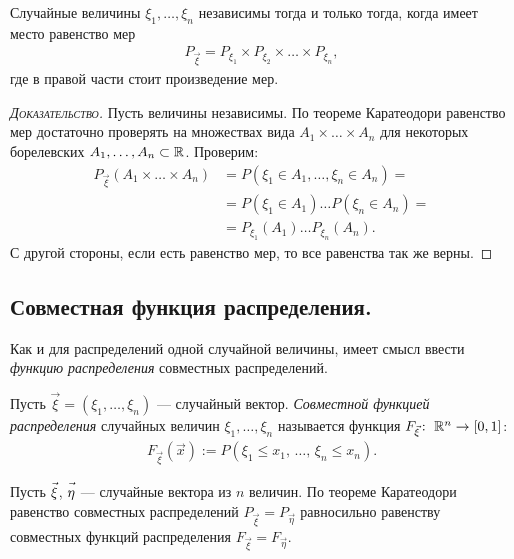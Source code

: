 \documentclass[../main.tex]{subfiles}
\begin{document}
\begin{thm}
 \label{theorem:random_variable_independence_through_distribution_measure_eq}
 Случайные величины $ \xi_1, \ldots, \xi_n $ независимы тогда и только тогда, когда имеет место равенство мер
 \begin{align}
  \label{equation:random_variable_independence_through_distribution_measure_eq}
  P_{\vec\xi} = P_{\xi_1} \times P_{\xi_2} \times \ldots \times P_{\xi_n},
 \end{align} где в правой части стоит произведение мер.
\end{thm}
\begin{proof}[\normalfont\textsc{Доказательство}]
 Пусть величины независимы. По теореме Каратеодори равенство мер достаточно проверять на множествах вида $ A_1 \times \ldots \times A_n $ для некоторых борелевских $ A_1, \ldots, A_n \subset \mathbb{R} $. Проверим:
 \begin{align*}
  P_{\vec\xi}(A_1 \times \ldots \times A_n) &= P(\xi_1 \in A_1, \ldots, \xi_n \in A_n) =  \\
  &= P(\xi_1 \in A_1) \ldots P(\xi_n \in A_n) = \\
  &= P_{\xi_1}(A_1) \ldots P_{\xi_n}(A_n).
 \end{align*} С другой стороны, если есть равенство мер, то все равенства так же верны.
\end{proof}

\subsection{Совместная функция распределения.}

Как и для распределений одной случайной величины, имеет смысл ввести \textit{функцию распределения} совместных распределений. 

\begin{df} Пусть $ \vec\xi = (\xi_1, \ldots, \xi_n) $ --- случайный вектор. \textit{Совместной функцией распределения} случайных величин $ \xi_1, \ldots, \xi_n $ называется функция $ F_{\vec\xi} \colon\;\mathbb{R}^{n}\to[0,1] $:
 \begin{align*}
  F_{\vec\xi}(\vec x) := P(\xi_1 \leqslant x_1,\, \ldots,\, \xi_n \leqslant x_n).
 \end{align*} 
\end{df}

\begin{remrk}
 Пусть $ \vec{\mathstrut\xi}$, $\vec{\mathstrut\eta} $ --- случайные вектора из $ n $ величин. По теореме Каратеодори равенство совместных распределений $ P_{\vec\xi} = P_{\vec\eta} $ равносильно равенству совместных функций распределения $ F_{\vec\xi} = F_{\vec\eta} $.
\end{remrk}
\end{document}
